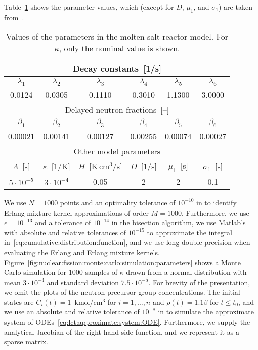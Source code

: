 Table~\ref{tab:nuclear:fission:parameters} shows the parameter values, which (except for $D$, $\mu_1$, and $\sigma_1$) are taken from~\cite{Leite:etal:2016}.
%
\begin{table}[t]
	\centering
	\caption{Values of the parameters in the molten salt reactor model. For $\kappa$, only the nominal value is shown.}
	\label{tab:nuclear:fission:parameters}
	\footnotesize
	\begin{tabular}{cccccc}
		\toprule
		\multicolumn{6}{c}{Decay constants~[1/s]} \\
		\midrule
		$\lambda_1$ & $\lambda_2$ & $\lambda_3$ & $\lambda_4$ & $\lambda_5$ & $\lambda_6$ \\
		0.0124 & 0.0305 & 0.1110 & 0.3010 & 1.1300 & 3.0000 \\
		\midrule
		\multicolumn{6}{c}{Delayed neutron fractions~[--]} \\
		\midrule
		$\beta_1$ & $\beta_2$ & $\beta_3$ & $\beta_4$ & $\beta_5$ & $\beta_6$ \\
		0.00021 & 0.00141 & 0.00127 & 0.00255 & 0.00074 & 0.00027 \\
		\midrule
		\multicolumn{6}{c}{Other model parameters} \\
		\midrule
		$\Lambda$~[s] & $\kappa$~[1/K] & $H$~[K\,cm$^3$/s] & $D$~[1/s] & $\mu_1$~[s] & $\sigma_1$~[s]\\%
		$5\cdot 10^{-5}$ & $3\cdot 10^{-4}$ & 0.05 & 2 & 2 & 0.1 \\
		\bottomrule
	\end{tabular}
\end{table}
%
We use $N = 1000$ points and an optimality tolerance of $10^{-10}$ in \fmincon{} to identify Erlang mixture kernel approximations of order $M = 1000$. Furthermore, we use $\epsilon = 10^{-13}$ and a tolerance of $10^{-14}$ in the bisection algorithm, we use Matlab's \integral{} with absolute and relative tolerances of $10^{-15}$ to approximate the integral in~\eqref{eq:cumulative:distribution:function}, and we use long double precision when evaluating the Erlang and Erlang mixture kernels.
%
Figure~\ref{fig:nuclear:fission:monte:carlo:simulation:parameters} shows a Monte Carlo simulation for 1000 samples of $\kappa$ drawn from a normal distribution with mean $3\cdot 10^{-4}$ and standard deviation $7.5 \cdot 10^{-5}$. For brevity of the presentation, we omit the plots of the neutron precursor group concentrations. The initial states are $C_i(t) = 1$~kmol/cm$^3$ for $i = 1, \ldots, n$ and $\rho(t) = 1.1 \beta$ for $t \leq t_0$, and we use an absolute and relative tolerance of $10^{-8}$ in \odeofs{} to simulate the approximate system of ODEs~\eqref{eq:lct:approximate:system:ODE}. Furthermore, we supply the analytical Jacobian of the right-hand side function, and we represent it as a sparse matrix.
